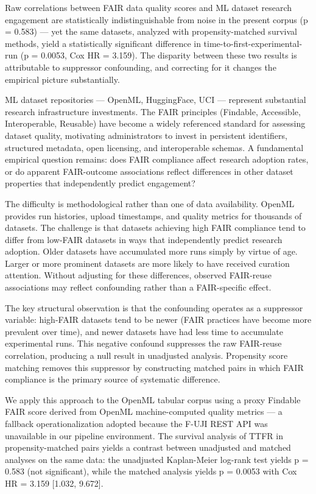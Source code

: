 
Raw correlations between FAIR data quality scores and ML dataset research engagement are statistically indistinguishable from noise in the present corpus (p = 0.583) — yet the same datasets, analyzed with propensity-matched survival methods, yield a statistically significant difference in time-to-first-experimental-run (p = 0.0053, Cox HR = 3.159). The disparity between these two results is attributable to suppressor confounding, and correcting for it changes the empirical picture substantially.

ML dataset repositories — OpenML, HuggingFace, UCI — represent substantial research infrastructure investments. The FAIR principles (Findable, Accessible, Interoperable, Reusable) \citep{Wilkinsonetal2016} have become a widely referenced standard for assessing dataset quality, motivating administrators to invest in persistent identifiers, structured metadata, open licensing, and interoperable schemas. A fundamental empirical question remains: does FAIR compliance affect research adoption rates, or do apparent FAIR-outcome associations reflect differences in other dataset properties that independently predict engagement?

The difficulty is methodological rather than one of data availability. OpenML provides run histories, upload timestamps, and quality metrics for thousands of datasets. The challenge is that datasets achieving high FAIR compliance tend to differ from low-FAIR datasets in ways that independently predict research adoption. Older datasets have accumulated more runs simply by virtue of age. Larger or more prominent datasets are more likely to have received curation attention. Without adjusting for these differences, observed FAIR-reuse associations may reflect confounding rather than a FAIR-specific effect.

The key structural observation is that the confounding operates as a suppressor variable: high-FAIR datasets tend to be newer (FAIR practices have become more prevalent over time), and newer datasets have had less time to accumulate experimental runs. This negative confound suppresses the raw FAIR-reuse correlation, producing a null result in unadjusted analysis. Propensity score matching removes this suppressor by constructing matched pairs in which FAIR compliance is the primary source of systematic difference.

We apply this approach to the OpenML tabular corpus using a proxy Findable FAIR score derived from OpenML machine-computed quality metrics — a fallback operationalization adopted because the F-UJI REST API was unavailable in our pipeline environment. The survival analysis of TTFR in propensity-matched pairs yields a contrast between unadjusted and matched analyses on the same data: the unadjusted Kaplan-Meier log-rank test yields p = 0.583 (not significant), while the matched analysis yields p = 0.0053 with Cox HR = 3.159 [1.032, 9.672].

